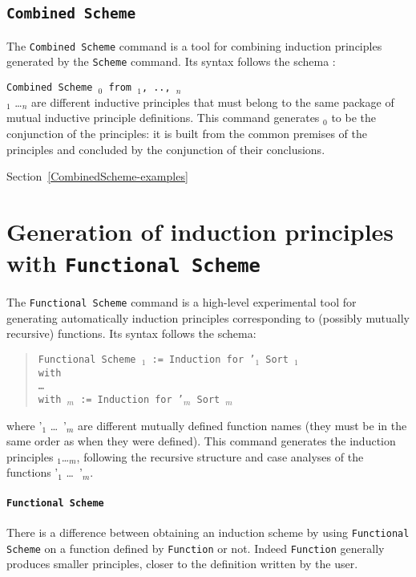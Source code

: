 \subsection{\tt Combined Scheme\label{CombinedScheme}
}
The {\tt Combined Scheme} command is a tool for combining 
induction principles generated by the {\tt Scheme} command.
Its syntax follows the schema :

\noindent
{\tt Combined Scheme {\ident$_0$} from {\ident$_1$}, .., {\ident$_n$}}\\
\ident$_1$ \ldots \ident$_n$ are different inductive principles that must belong to
the same package of mutual inductive principle definitions. This command
generates {\ident$_0$} to be the conjunction of the principles: it is
built from the common premises of the principles and concluded by the
conjunction of their conclusions.

\SeeAlso Section~\ref{CombinedScheme-examples}

\section{Generation of induction principles with {\tt Functional Scheme}
\label{FunScheme}
}

The {\tt Functional Scheme} command is a high-level experimental
tool for generating automatically induction principles
corresponding to (possibly mutually recursive) functions.  Its
syntax follows the schema:
\begin{quote}
{\tt Functional Scheme {\ident$_1$} := Induction for \ident'$_1$ Sort {\sort$_1$} \\
  with\\
  \mbox{}\hspace{0.1cm} \dots\ \\
        with {\ident$_m$} := Induction for {\ident'$_m$} Sort
        {\sort$_m$}}
\end{quote}  
where \ident'$_1$ \dots\ \ident'$_m$ are different mutually defined function
names (they must be in the same order as when they were defined).
This command generates the induction principles
\ident$_1$\dots\ident$_m$, following the recursive structure and case
analyses of the functions \ident'$_1$ \dots\ \ident'$_m$.


\paragraph{\texttt{Functional Scheme}} 
There is a difference between obtaining an induction scheme by using
\texttt{Functional Scheme} on a function defined by \texttt{Function}
or not. Indeed \texttt{Function} generally produces smaller
principles, closer to the definition written by the user.


